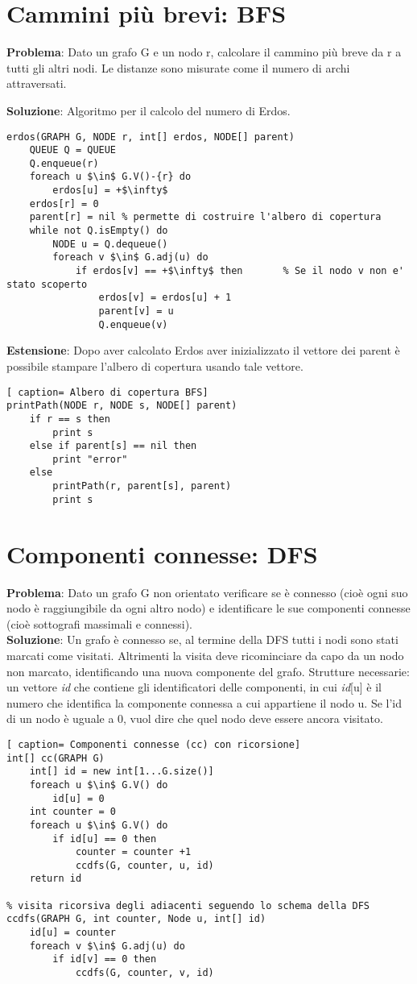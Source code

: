 \documentclass[../cheatSheetAlgoritmi.tex]{subfiles}
\begin{document}
\section{Cammini più brevi: BFS}
\textbf{Problema}: Dato un grafo G e un nodo r, calcolare il cammino più breve da r a tutti gli altri nodi. Le distanze sono misurate come il numero di archi attraversati.

\textbf{Soluzione}: Algoritmo per il calcolo del numero di Erdos.

\begin{lstlisting}[caption= Erdos]
erdos(GRAPH G, NODE r, int[] erdos, NODE[] parent)
	QUEUE Q = QUEUE
	Q.enqueue(r)
	foreach u $\in$ G.V()-{r} do
		erdos[u] = +$\infty$
	erdos[r] = 0
	parent[r] = nil % permette di costruire l'albero di copertura
	while not Q.isEmpty() do
		NODE u = Q.dequeue()
		foreach v $\in$ G.adj(u) do
			if erdos[v] == +$\infty$ then		% Se il nodo v non e' stato scoperto
				erdos[v] = erdos[u] + 1
				parent[v] = u
				Q.enqueue(v)
\end{lstlisting}
\textbf{Estensione}: Dopo aver calcolato Erdos aver inizializzato il vettore dei parent è possibile stampare l'albero di copertura usando tale vettore.\
\begin{lstlisting}[ caption= Albero di copertura BFS]
printPath(NODE r, NODE s, NODE[] parent)
	if r == s then
		print s
	else if parent[s] == nil then
		print "error"
	else
		printPath(r, parent[s], parent)
		print s
\end{lstlisting}
\section{Componenti connesse: DFS}
\textbf{Problema}: Dato un grafo G non orientato verificare se è connesso (cioè  ogni suo nodo è raggiungibile da ogni altro nodo) e identificare le sue componenti connesse (cioè sottografi massimali e connessi).\\
\textbf{Soluzione}: Un grafo è connesso se, al termine della DFS tutti i nodi sono stati marcati come visitati. Altrimenti la visita deve ricominciare da capo da un nodo non marcato, identificando una nuova componente del grafo. Strutture necessarie: un vettore \textit{id} che contiene gli identificatori delle componenti, in cui \textit{id}[u] è il numero che identifica la componente connessa a cui appartiene il nodo u. Se l'id di un nodo è uguale a 0, vuol dire che quel nodo deve essere ancora visitato.\
\newpage
\begin{lstlisting}[ caption= Componenti connesse (cc) con ricorsione]
int[] cc(GRAPH G)
	int[] id = new int[1...G.size()]
	foreach u $\in$ G.V() do
		id[u] = 0
	int counter = 0
	foreach u $\in$ G.V() do
		if id[u] == 0 then
			counter = counter +1
			ccdfs(G, counter, u, id)
	return id

% visita ricorsiva degli adiacenti seguendo lo schema della DFS	
ccdfs(GRAPH G, int counter, Node u, int[] id)
	id[u] = counter
	foreach v $\in$ G.adj(u) do
		if id[v] == 0 then
			ccdfs(G, counter, v, id)
\end{lstlisting}
\end{document}
